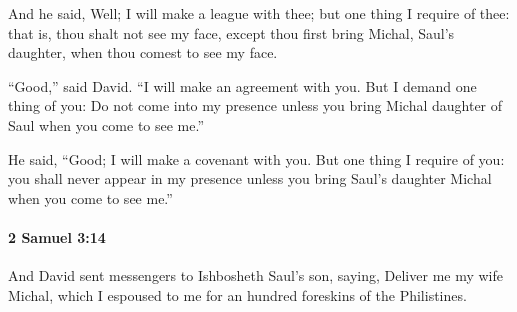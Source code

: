 			\begin{versebox}
					\item[BHS] 
					\item[ASV] And he said, Well; I will make a league with thee; but one thing I require of thee: that is, thou shalt not see my face, except thou first bring Michal, Saul's daughter, when thou comest to see my face.
					\item[NIV] “Good,” said David. “I will make an agreement with you. But I demand one thing of you: Do not come into my presence unless you bring Michal daughter of Saul when you come to see me.”
					\item[NRSV] He said, “Good; I will make a covenant with you. But one thing I require of you: you shall never appear in my presence unless you bring Saul’s daughter Michal when you come to see me.”
			\end{versebox}

		\paragraph{2 Samuel 3:14} %
			\label{2SAMUEL-3-14}

			And David sent messengers to Ishbosheth Saul’s son, saying, Deliver me my wife Michal, which I espoused to me for an hundred foreskins of the Philistines.


